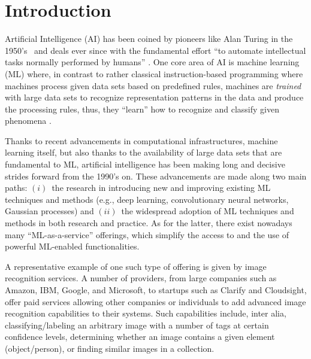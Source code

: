 \documentclass[sigconf,review,anonymous]{acmart}
\begin{document}
\maketitle


\section{Introduction}

Artificial Intelligence (AI) has been coined by pioneers like Alan Turing in the 1950's~\cite{turing1950computing} and deals ever since with the fundamental effort ``to automate intellectual tasks normally performed by humans'' \cite{deepLearning2017}. One core area of AI is machine learning (ML) where, in contrast to rather classical instruction-based programming where machines process given data sets based on predefined rules, machines are \emph{trained} with large data sets to recognize representation patterns in the data and produce the processing rules, thus, they ``learn'' how to recognize and classify given phenomena \cite{deepLearning2017}.

Thanks to recent advancements in computational infrastructures, machine learning itself, but also thanks to the availability of large data sets that are fundamental to ML, artificial intelligence has been making long and decisive strides forward from the 1990's on. These advancements are made along two main paths: $(i)$~the research in introducing new and improving existing ML techniques and methods (e.g., deep learning, convolutionary neural networks, Gaussian processes) and $(ii)$~the widespread adoption of ML techniques and methods in both research and practice. As for the latter, there exist nowadays many ``ML-as-a-service'' offerings, which simplify the access to and the use of powerful ML-enabled functionalities.  

A representative example of one such type of offering is given by image recognition services. A number of providers, from large companies such as Amazon, IBM, Google, and Microsoft, to startups such as Clarify and Cloudsight, offer paid services allowing other companies or individuals to add advanced image recognition capabilities to their systems. Such capabilities include, inter alia, classifying/labeling an arbitrary image with a number of tags at certain confidence levels, determining whether an image  contains a given element (object/person), or finding similar images in a collection.
\end{document}
